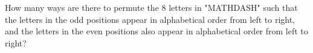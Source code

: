 How many ways are there to permute the $8$ letters in "MATHDASH" such that the letters in the odd positions appear in alphabetical order from left to right, and the letters in the even positions also appear in alphabetical order from left to right?
